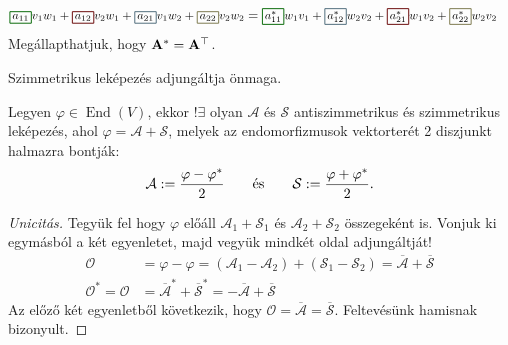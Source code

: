 \begin{note}
\begin{align*}
    \scalebox{.92}{$
        \rected{$a_{11}$}{green!40!black} v_1 w_1
        + \rected{$a_{12}$}{primaryColor} v_2 w_1
        + \rected{$a_{21}$}{secondaryColor} v_1 w_2
        + \rected{$a_{22}$}{ternaryColor} v_2 w_2
      $}
     & = \scalebox{.92}{$
        \rected{$a_{11}^*$}{green!40!black} w_1 v_1
        + \rected{$a_{12}^*$}{secondaryColor} w_2 v_2
        + \rected{$a_{21}^*$}{primaryColor} w_1 v_2
        + \rected{$a_{22}^*$}{ternaryColor} w_2 v_2
      $}
  \end{align*}
  Megállapthatjuk, hogy $\mathbf{A}^* = \mathbf{A}^\top$.
\end{note}

\begin{statement}
  Szimmetrikus leképezés adjungáltja önmaga.
\end{statement}

\begin{statement}
  Legyen $\varphi \in \operatorname{End}(V)$, ekkor $!\exists$ olyan
  $\mathcal A$ és $\mathcal S$ antiszimmetrikus és szimmetrikus leképezés, ahol
  $\varphi = \mathcal A + \mathcal S$, melyek az endomorfizmusok vektorterét 2
  diszjunkt halmazra bontják:
  $$
    \mathcal A := \frac{\varphi - \varphi^*}{2}
    \qquad\text{és}\qquad
    \mathcal S := \frac{\varphi + \varphi^*}{2}
    \text.
  $$

  \begin{proof}[Unicitás]
    Tegyük fel hogy $\varphi$ előáll $\mathcal A_1 + \mathcal S_1$ és
    $\mathcal A_2 + \mathcal S_2$ összegeként is. Vonjuk ki egymásból
    a két egyenletet, majd vegyük mindkét oldal adjungáltját!
    \begin{align*}
      \mathcal O
       & = \varphi - \varphi
      = \left( \mathcal A_1 - \mathcal A_2 \right)
      + \left( \mathcal S_1 - \mathcal S_2 \right)
      = \mathcal{\overline A} + \mathcal{\overline S}
      \\
      \mathcal O^*
      = \mathcal O
       & = \mathcal{\overline A^*} + \mathcal{\overline S^*}
      = -\mathcal{\overline A} + \mathcal{\overline S}
    \end{align*}
    Az előző két egyenletből következik, hogy
    $\mathcal{O = \overline A = \overline S}$. Feltevésünk hamisnak bizonyult.
  \end{proof}
\end{statement}

